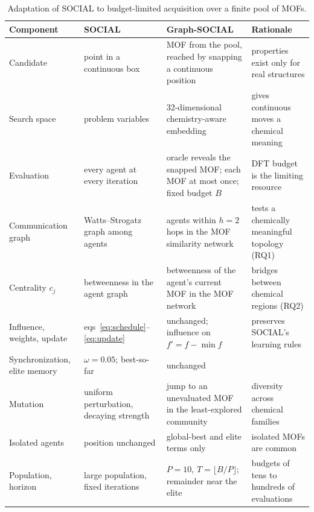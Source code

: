 \documentclass[journal=jcisd8,manuscript=article]{achemso}
\newcommand{\gs}{Graph-SOCIAL}
\begin{document}
\begin{table}
\caption{Adaptation of SOCIAL to budget-limited acquisition over a finite pool of MOFs.}
\label{tab:adaptation}
\scriptsize
\begin{tabular}{@{}p{2.3cm}p{4.0cm}p{4.6cm}p{4.2cm}@{}}
\toprule
Component & SOCIAL\cite{jalali2026social} & \gs{} & Rationale \\
\midrule
Candidate & point in a continuous box & MOF from the pool, reached by snapping a continuous position & properties exist only for real structures \\
Search space & problem variables & 32-dimensional chemistry-aware embedding & gives continuous moves a chemical meaning \\
Evaluation & every agent at every iteration & oracle reveals the snapped MOF; each MOF at most once; fixed budget $B$ & DFT budget is the limiting resource \\
Communication graph & Watts--Strogatz graph among agents & agents within $h=2$ hops in the MOF similarity network & tests a chemically meaningful topology (RQ1) \\
Centrality $c_j$ & betweenness in the agent graph & betweenness of the agent's current MOF in the MOF network & bridges between chemical regions (RQ2) \\
Influence, weights, update & eqs~\ref{eq:schedule}--\ref{eq:update} & unchanged; influence on $f'=f-\min f$ & preserves SOCIAL's learning rules \\
Synchronization, elite memory & $\omega=0.05$; best-so-far & unchanged & \\
Mutation & uniform perturbation, decaying strength & jump to an unevaluated MOF in the least-explored community & diversity across chemical families \\
Isolated agents & position unchanged & global-best and elite terms only & isolated MOFs are common \\
Population, horizon & large population, fixed iterations & $P=10$, $T=\lfloor B/P\rfloor$; remainder near the elite & budgets of tens to hundreds of evaluations \\
\bottomrule
\end{tabular}
\end{table}
\end{document}
